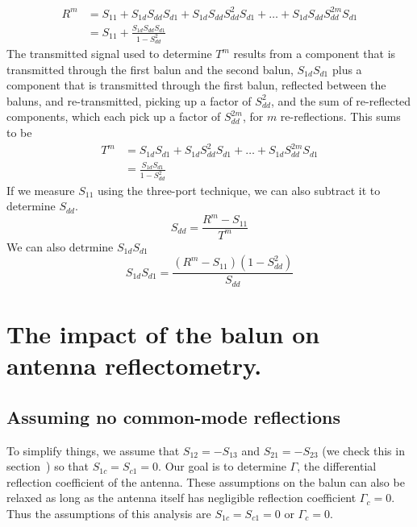 \documentclass[preprint]{aastex}
\begin{document}
\begin{align}
R^m &= S_{11} + S_{1d}S_{dd}S_{d1} + S_{1d}S_{dd} S_{dd}^2 S_{d1} + \dots + S_{1d} S_{dd} S_{dd}^{2m} S_{d1} \nonumber \\
&= S_{11} + \frac{S_{1d} S_{dd} S_{d1}}{1-S_{dd}^2}\label{eq:ReflectionBackToBack}
\end{align}
The transmitted signal used to determine $T^m$ results from a component that is transmitted through the first balun and the second balun, $S_{1d}S_{d1}$ plus a component that is transmitted through the first balun, reflected between the baluns, and re-transmitted, picking up a factor of $S_{dd}^2$, and the sum of re-reflected components, which each pick up a factor of $S_{dd}^{2m}$, for $m$ re-reflections. This sums to be 
\begin{align}
T^m &= S_{1d}S_{d1} + S_{1d}S_{dd}^2S_{d1} + \dots + S_{1d} S_{dd}^{2m} S_{d1} \nonumber \\
 & = \frac{S_{1d}S_{d1}}{1-S_{dd}^2}\label{eq:TransmissionBackToBack}
\end{align}
If we measure $S_{11}$ using the three-port technique, we can also subtract it to determine $S_{dd}$. 
\begin{equation}
S_{dd} = \frac{R^m - S_{11}}{T^m}
\end{equation}
We can also detrmine $S_{1d} S_{d1}$ 
\begin{equation}
S_{1d}S_{d1} = \frac{\left(R^m-S_{11}\right)\left(1-S_{dd}^2\right)}{S_{dd}}
\end{equation}
\section{The impact of the balun on antenna reflectometry.}
\subsection{Assuming no common-mode reflections}
To simplify things, we assume that $S_{12}=-S_{13}$ and $S_{21}=-S_{23}$ (we check this in section~\label{sec:BalunMeasurements}) so that $S_{1c}=S_{c1}=0$. Our goal is to determine $\Gamma$, the differential reflection coefficient of the antenna. These assumptions on the balun can also be relaxed as long as the antenna itself has negligible reflection coefficient $\Gamma_c = 0$. Thus the assumptions of this analysis are $S_{1c}=S_{c1}=0$ or $\Gamma_c = 0$. 
\end{document}
